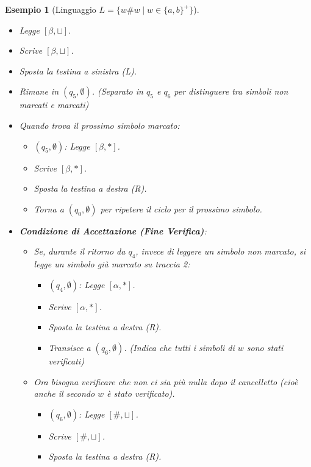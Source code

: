 \documentclass[a4paper]{article}
\newtheorem{example}{Esempio}
\begin{document}
\begin{example}[Linguaggio $L = \{w\#w \mid w \in \{a,b\}^+\}$]
\begin{itemize}
\begin{itemize}
            \item Legge $[\beta, \sqcup]$.
            \item Scrive $[\beta, \sqcup]$.
            \item Sposta la testina a sinistra (L).
            \item Rimane in $(q_5, \emptyset)$. (Separato in $q_5$ e $q_6$ per distinguere tra simboli non marcati e marcati)
            \item Quando trova il prossimo simbolo marcato:
                \begin{itemize}
                    \item $(q_5, \emptyset)$: Legge $[\beta, *]$.
                    \item Scrive $[\beta, *]$.
                    \item Sposta la testina a destra (R).
                    \item Torna a $(q_0, \emptyset)$ per ripetere il ciclo per il prossimo simbolo.
                \end{itemize}
            \item \textbf{Condizione di Accettazione (Fine Verifica)}:
                \begin{itemize}
                    \item Se, durante il ritorno da $q_4$, invece di leggere un simbolo non marcato, si legge un simbolo già marcato su traccia 2:
                        \begin{itemize}
                            \item $(q_4, \emptyset)$: Legge $[\alpha, *]$.
                            \item Scrive $[\alpha, *]$.
                            \item Sposta la testina a destra (R).
                            \item Transisce a $(q_6, \emptyset)$. (Indica che tutti i simboli di $w$ sono stati verificati)
                        \end{itemize}
                    \item Ora bisogna verificare che non ci sia più nulla dopo il cancelletto (cioè anche il secondo $w$ è stato verificato).
                        \begin{itemize}
                            \item $(q_6, \emptyset)$: Legge $[\#, \sqcup]$.
                            \item Scrive $[\#, \sqcup]$.
                            \item Sposta la testina a destra (R).

\end{itemize}
\end{itemize}
\end{itemize}
\end{itemize}
\end{example}
\end{document}
